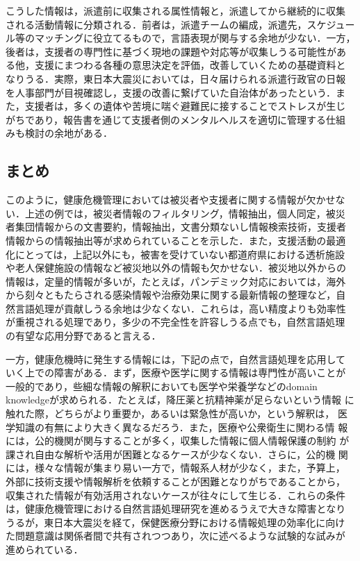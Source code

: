 \documentclass[japanese]{jnlp_1.4}
\begin{document}
こうした情報は，派遣前に収集される属性情報と，派遣してから継続的に収集
される活動情報に分類される．前者は，派遣チームの編成，派遣先，スケジュー
ル等のマッチングに役立てるもので，言語表現が関与する余地が少ない．一方，
後者は，支援者の専門性に基づく現地の課題や対応等が収集しうる可能性があ
る他，支援にまつわる各種の意思決定を評価，改善していくための基礎資料と
なりうる．実際，東日本大震災においては，日々届けられる派遣行政官の日報
を人事部門が目視確認し，支援の改善に繋げていた自治体があったという．ま
た，支援者は，多くの遺体や苦境に喘ぐ避難民に接することでストレスが生じ
がちであり，報告書を通じて支援者側のメンタルヘルスを適切に管理する仕組
みも検討の余地がある．


\subsection{まとめ}

このように，健康危機管理においては被災者や支援者に関する情報が欠かせな
い．上述の例では，被災者情報のフィルタリング，情報抽出，個人同定，被災
者集団情報からの文書要約，情報抽出，文書分類ないし情報検索技術，支援者
情報からの情報抽出等が求められていることを示した．また，支援活動の最適
化にとっては，上記以外にも，被害を受けていない都道府県における透析施設
や老人保健施設の情報など被災地以外の情報も欠かせない．被災地以外からの
情報は，定量的情報が多いが，たとえば，パンデミック対応においては，海外
から刻々ともたらされる感染情報や治療効果に関する最新情報の整理など，自
然言語処理が貢献しうる余地は少なくない．これらは，高い精度よりも効率性
が重視される処理であり，多少の不完全性を許容しうる点でも，自然言語処理
の有望な応用分野であると言える．

一方，健康危機時に発生する情報には，下記の点で，自然言語処理を応用して
いく上での障害がある．まず，医療や医学に関する情報は専門性が高いことが
一般的であり，些細な情報の解釈においても医学や栄養学などのdomain
knowledgeが求められる．たとえば，降圧薬と抗精神薬が足らないという情報
に触れた際，どちらがより重要か，あるいは緊急性が高いか，という解釈は，
医学知識の有無により大きく異なるだろう．また，医療や公衆衛生に関わる情
報には，公的機関が関与することが多く，収集した情報に個人情報保護の制約
が課され自由な解析や活用が困難となるケースが少なくない．さらに，公的機
関には，様々な情報が集まり易い一方で，情報系人材が少なく，また，予算上，
外部に技術支援や情報解析を依頼することが困難となりがちであることから，
収集された情報が有効活用されないケースが往々にして生じる．これらの条件
は，健康危機管理における自然言語処理研究を進めるうえで大きな障害となり
うるが，東日本大震災を経て，保健医療分野における情報処理の効率化に向け
た問題意識は関係者間で共有されつつあり，次に述べるような試験的な試みが
進められている．
\end{document}
